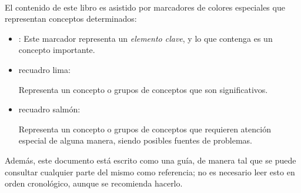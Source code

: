 \documentclass[../main.tex]{subfiles}
\begin{document}
\hfill\\

El contenido de este libro es asistido por marcadores de colores especiales que representan conceptos determinados:

\begin{itemize}
    \item {}: Este marcador representa un \emph{elemento clave}, y lo que contenga es un concepto importante.
    \item recuadro lima:\begin{recuadroV}
            Representa un concepto o grupos de conceptos que son significativos.
    \end{recuadroV}
    \item recuadro salmón:\begin{recuadroR}
            Representa un concepto o grupos de conceptos que requieren atención especial de alguna manera, siendo posibles fuentes de problemas.
    \end{recuadroR}
\end{itemize}

\vfill

Además, este documento está escrito como una guía, de manera tal que se puede consultar cualquier parte del mismo como referencia; no es necesario leer esto en orden cronológico, aunque se recomienda hacerlo.
\end{document}

